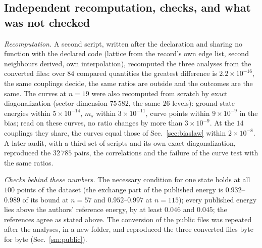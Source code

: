 \documentclass[aps,prx,onecolumn,10pt,nofootinbib,longbibliography,floatfix]{revtex4-2}
\theoremstyle{remark}
\newcommand{\ms}{m_s}
\begin{document}
\subsection{Independent recomputation, checks, and what was not checked}
\label{sm:publicrecomp}
\emph{Recomputation.} A second script, written after the declaration and sharing no function with the declared
code (lattice from the record's own edge list, second neighbours derived, own interpolation), recomputed the three
analyses from the converted files: over $84$ compared quantities the greatest difference is $2.2\times10^{-16}$, the %
same couplings decide, the same ratios are outside and the outcomes are the same. The curves at $n=19$ were also
recomputed from scratch by exact diagonalization (sector dimension $75\,582$, the same $26$ levels): ground-state %
energies within $5\times10^{-14}$, $\ms$ within $3\times10^{-11}$, curve points within $9\times10^{-9}$ in the bias; %
read on these curves, no ratio changes by more than $3\times10^{-9}$. At the $14$ couplings they share, the curves %
equal those of Sec.~\ref{sec:biaslaw} within $2\times10^{-8}$. A later audit, with a third set of scripts and its %
own exact diagonalization, reproduced the $32\,785$ pairs, the correlations and the failure of the curve test with %
the same ratios.

\emph{Checks behind these numbers.} The necessary condition for one state holds at all $100$ points of the dataset %
(the exchange part of the published energy is $0.932$--$0.989$ of its bound at $n=57$ and $0.952$--$0.997$ at %
$n=115$); every published energy lies above the authors' reference energy, by at least $0.046$ and $0.045$; the %
references agree as stated above. The conversion of the public files was repeated after the analyses, in a new
folder, and reproduced the three converted files byte for byte (Sec.~\ref{sm:public}).
\end{document}

